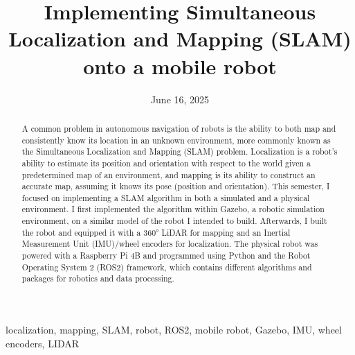\documentclass[12pt,conference,onecolumn]{IEEEtran}
\title{Implementing {S}imultaneous {L}ocalization and {M}apping ({SLAM}) onto a mobile robot}
\author{\IEEEauthorblockN{Saketh Ayyagari}\IEEEauthorblockA{Science \& Engineering\\Manalapan High School\\Englishtown, NJ\\425sayyagari@frhsd.com}}
\date{June 16, 2025}
\newcommand{\keywords}{localization, mapping, SLAM, robot, ROS2, mobile robot, Gazebo, IMU, wheel encoders, LIDAR}
\begin{document}
\maketitle 

\begin{abstract}
A common problem in autonomous navigation of robots is the ability to both map and consistently know its location in an unknown environment, more commonly known as the Simultaneous Localization and Mapping (SLAM) problem. Localization is a robot's ability to estimate its position and orientation with respect to the world given a predetermined map of an environment, and mapping is its ability to construct an accurate map, assuming it knows its pose (position and orientation). This semester, I focused on implementing a SLAM algorithm in both a simulated and a physical environment. I first implemented the algorithm within Gazebo, a robotic simulation environment, on a similar model of the robot I intended to build. Afterwards, I built the robot and equipped it with a \ang{360} LiDAR for mapping and an Inertial Measurement Unit (IMU)/wheel encoders for localization. The physical robot was powered with a Raspberry Pi 4B and programmed using Python and the Robot Operating System 2 (ROS2) framework, which contains different algorithms and packages for robotics and data processing. 
\end{abstract}

\begin{IEEEkeywords}
\keywords
\end{IEEEkeywords}
\end{document}
